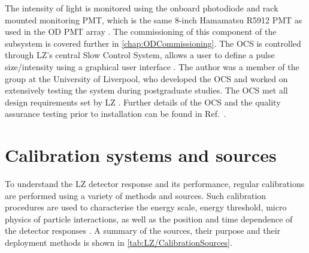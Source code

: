 The intensity of light is monitored using the onboard photodiode and rack mounted monitoring PMT, which is the same 8-inch Hamamatsu R5912 PMT as used in the OD PMT array \cite{Turner:2021qvi}. The commissioning of this component of the subsystem is covered further in \autoref{chap:ODCommissioning}. The OCS is controlled through LZ's central Slow Control System, allows a user to define a pulse size/intensity using a graphical user interface \cite{hbirch:thesis}.
The author was a member of the group at the University of Liverpool, who developed the OCS and worked on extensively testing the system during postgraduate studies. The OCS met all design requirements set by LZ \cite{Turner:2021qvi}. Further details of the OCS and the quality assurance testing prior to installation can be found in Ref.~\cite{hbirch:thesis,Turner:2021qvi}.
\section{Calibration systems and sources}\label{sec:LZ/CalibrationSources}
To understand the LZ detector response and its performance, regular calibrations are performed using a variety of methods and sources. Such calibration procedures are used to characterise the energy scale, energy threshold, micro physics of particle interactions, as well as the position and time dependence of the detector responses \cite{LZ:2024bsz}. A summary of the sources, their purpose and their deployment methods is shown in \autoref{tab:LZ/CalibrationSources}.
